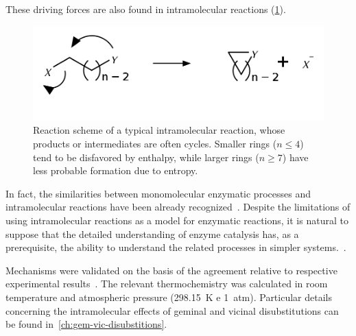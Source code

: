 These driving forces are also found in intramolecular reactions (\cref{fig:reacoes-intramoleculares}).
%
\begin{figure}[hbtp]
	\centering
	\includegraphics[width=.6\textwidth]{figures/reacao-intramolecular}
	\caption[Typical scheme of an intramolecular reactions.]{
		Reaction scheme of a typical intramolecular reaction,
		whose products or
		intermediates are often cycles.
		Smaller rings ($n \le 4 $)
		tend to be disfavored by enthalpy,
		while larger rings ($n \ge 7 $)
		have less probable formation due to entropy.}%
	\label{fig:reacoes-intramoleculares}
\end{figure}
%
In fact,
the similarities between monomolecular enzymatic processes and
intramolecular reactions have been already recognized~\cite{Nilsson_1933,Bruice_1960b,Jung_1990}.
Despite the limitations of using intramolecular reactions as a model for
enzymatic reactions,
it is natural to suppose that the detailed understanding
of enzyme catalysis has,
as a prerequisite,
the ability to understand the
related processes in simpler systems.~\cite{Kirby_1972}.

Mechanisms were validated on the basis of the agreement relative to respective experimental results~\cite{Kirby_1972,Jung_2005}.
The relevant thermochemistry was calculated in room temperature and atmospheric pressure (298.15~K e 1~atm).
Particular details concerning the intramolecular effects of geminal and
vicinal disubstitutions can be found in~\cref{ch:gem-vic-disubstitions}.
